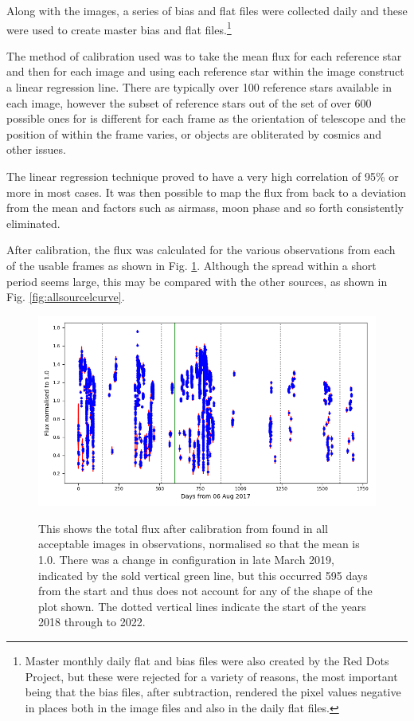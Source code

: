 Along with the images, a series of bias and flat files were collected daily and
these were used to create master bias and flat files.\footnote{Master monthly
daily flat and bias files were also created by the Red Dots Project, but these
were rejected for a variety of reasons, the most important being that the bias
files, after subtraction, rendered the pixel values negative in places both in
the image files and also in the daily flat files.}

The method of calibration used was to take the mean flux for each reference
star and then for each image and using each reference star within the image
construct a linear regression line. There are typically over 100 reference
stars available in each image, however the subset of reference stars out of the
set of over 600 possible ones for {\ross} is different for each frame as the
orientation of telescope and the position of {\ross} within the frame varies, or
objects are obliterated by cosmics and other issues.

The linear regression technique proved to have a very high correlation of
95\% or more in most cases. It was then possible to map the flux from {\ross}
back to a deviation from the mean and factors such as airmass, moon phase and so
forth consistently eliminated.

After calibration, the flux was calculated for the various observations from each
of the usable frames as shown in Fig. \ref{fig:rossallcurve}. Although the
spread within a short period seems large, this may be compared with the other
sources, as shown in Fig. \ref{fig:allsourcelcurve}.

\begin{figure}[!htbp]
\begin{center}
\includegraphics[scale=0.40]{REM/images/remrossallcurve.png} \\
\vspace{-.5cm}
\end{center}   
\caption{This shows the total flux after calibration from {\ross}
found in all acceptable images in {\rem}
observations, normalised so that the mean is 1.0. There was a change in
configuration in late March 2019, indicated by the sold vertical green line, but
this occurred 595 days from the start and thus does
not account for any of the shape of the plot
shown. The dotted vertical lines indicate the
start of the years 2018 through to 2022.}\protect\label{fig:rossallcurve}
\end{figure}

